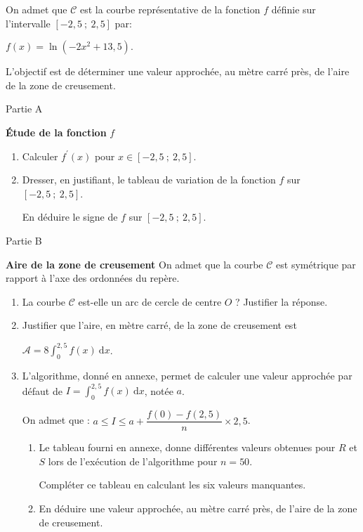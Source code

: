 On admet que $\mathscr{C}$ est la courbe représentative de la fonction $f$ définie sur l'intervalle $[- 2,5~;~2,5]$ par:
\begin{center}$f(x) = \ln \left(- 2x^2+13,5\right).$\end{center}
L'objectif est de déterminer une valeur approchée, au mètre carré près, de l'aire de la zone de creusement.
\begin{h3}Partie A\end{h3}
\textbf{Étude de la fonction }  $f$
\begin{enumerate}
     \item
     Calculer $f^\prime(x)$ pour $x \in  [- 2,5~;~2,5]$.
     \item
     Dresser, en justifiant, le tableau de variation de la fonction $f$ sur $[- 2,5~;~2,5]$.
     \par
     En déduire le signe de $f$ sur $[- 2,5~;~2,5]$.
\end{enumerate}
\begin{h3}Partie B\end{h3}
\textbf{Aire de la zone de creusement}
On admet que la courbe $\mathscr{C}$ est symétrique par rapport à l'axe des ordonnées du repère.
\begin{enumerate}
     \item
     La courbe $\mathscr{C}$ est-elle un arc de cercle de centre $O$ ? Justifier la réponse.
     \item
     Justifier que l'aire, en mètre carré, de la zone de creusement est
     \par
     $\mathscr{A} = 8\int_0^{2,5}  f(x)\:\text{d}x$.
     \item
     L'algorithme, donné en annexe, permet de calculer une valeur approchée par défaut de $I = \int_0^{2,5}  f(x)\:\text{d}x$, notée $a$.
     \par
     On admet que : $a \leqslant  I \leqslant a+\dfrac{f(0)-f(2,5)}{n}\times  2,5$.
     \begin{enumerate}
          \item
          Le tableau fourni en annexe, donne différentes valeurs obtenues pour $R$ et $S$ lors de l'exécution de l'algorithme pour $n = 50$.
          \par
          Compléter ce tableau en calculant les six valeurs manquantes.
          \item
          En déduire une valeur approchée, au mètre carré près, de l'aire de la zone de creusement.
     \end{enumerate}
\end{enumerate}
